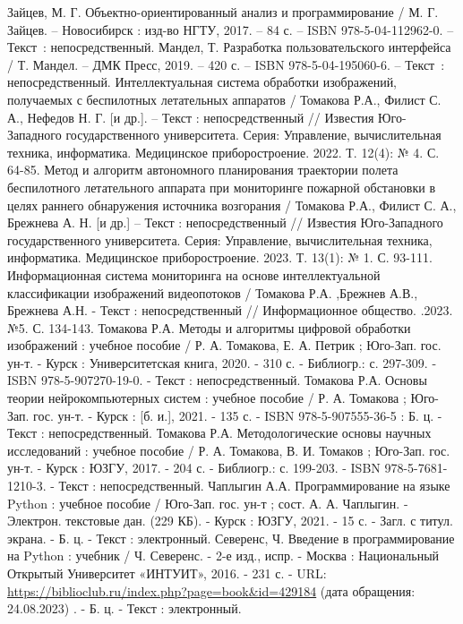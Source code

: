 \begin{thebibliography}{50}
     Зайцев, М. Г. Объектно-ориентированный анализ и программирование / М. Г. Зайцев. – Новосибирск : изд-во НГТУ, 2017. – 84 с. – ISBN 978-5-04-112962-0. – Текст~: непосредственный.
     Мандел, Т. Разработка пользовательского интерфейса / Т. Мандел. – ДМК Пресс, 2019. – 420 с. – ISBN 978-5-04-195060-6. – Текст~: непосредственный.
     Интеллектуальная система обработки изображений, получаемых с беспилотных летательных аппаратов / Томакова Р.А., Филист С. А., Нефедов Н. Г. [и др.]. – Текст : непосредственный // Известия Юго-Западного государственного университета. Серия: Управление, вычислительная техника, информатика. Медицинское приборостроение. 2022. Т. 12(4): № 4. С. 64-85.
     Метод и алгоритм автономного планирования траектории полета беспилотного летательного аппарата при мониторинге пожарной обстановки в целях раннего обнаружения источника возгорания / Томакова Р.А., Филист С. А., Брежнева А. Н. [и др.] – Текст : непосредственный // Известия Юго-Западного государственного университета. Серия: Управление, вычислительная техника, информатика. Медицинское приборостроение. 2023. Т. 13(1): № 1. С. 93-111.
     Информационная система мониторинга на основе интеллектуальной классификации изображений видеопотоков / Томакова Р.А. ,Брежнев А.В., Брежнева А.Н. -  Текст : непосредственный // Информационное общество. .2023. №5. С. 134-143.
     Томакова Р.А.  Методы и алгоритмы цифровой обработки изображений : учебное пособие / Р. А. Томакова, Е. А. Петрик ; Юго-Зап. гос. ун-т. - Курск : Университетская книга, 2020. - 310 с. - Библиогр.: с. 297-309. - ISBN 978-5-907270-19-0. - Текст : непосредственный.
     Томакова Р.А.  Основы теории нейрокомпьютерных систем : учебное пособие / Р. А. Томакова ; Юго-Зап. гос. ун-т. - Курск : [б. и.], 2021. - 135 с. - ISBN 978-5-907555-36-5 : Б. ц. - Текст : непосредственный.
     Томакова Р.А.  Методологические основы научных исследований : учебное пособие / Р. А. Томакова, В. И. Томаков ; Юго-Зап. гос. ун-т. - Курск : ЮЗГУ, 2017. - 204 с. - Библиогр.: с. 199-203. - ISBN 978-5-7681-1210-3. - Текст : непосредственный.
     Чаплыгин А.А. Программирование на языке Python : учебное пособие / Юго-Зап. гос. ун-т ; сост. А. А. Чаплыгин. - Электрон. текстовые дан. (229 КБ). - Курск : ЮЗГУ, 2021. - 15 с. - Загл. с титул. экрана. - Б. ц. - Текст : электронный.
     Северенс, Ч.   Введение в программирование на Python : учебник / Ч. Северенс. - 2-е изд., испр. - Москва : Национальный Открытый Университет «ИНТУИТ», 2016. - 231 с. - URL: \url{https://biblioclub.ru/index.php?page=book&id=429184} (дата обращения: 24.08.2023) . - Б. ц. - Текст : электронный.

\end{thebibliography}
